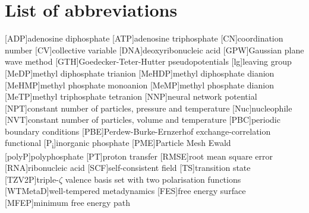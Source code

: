 \chapter*{List of abbreviations}

\begin{acronym}
    [ADP]{adenosine diphosphate}
    [ATP]{adenosine triphosphate}
    [CN]{coordination number}
    [CV]{collective variable}
    [DNA]{deoxyribonucleic acid}
    [GPW]{Gaussian plane wave method}
    [GTH]{Goedecker-Teter-Hutter pseudopotentials}
    [lg]{leaving group}
    [MeDP]{methyl diphosphate trianion}
    [MeHDP]{methyl diphosphate dianion}
    [MeHMP]{methyl phosphate monoanion}
    [MeMP]{methyl phosphate dianion}
    [MeTP]{methyl triphosphate tetranion}
    [NNP]{neural network potential}
    [NPT]{constant number of particles, pressure and temperature}
    [Nuc]{nucleophile}
    [NVT]{constant number of particles, volume and temperature}
    [PBC]{periodic boundary conditions}
    [PBE]{Perdew-Burke-Ernzerhof exchange-correlation functional}
    [P\textsubscript{i}]{inorganic phosphate}
    [PME]{Particle Mesh Ewald}
    [polyP]{polyphosphate}
    [PT]{proton transfer}
    [RMSE]{root mean square error}
    [RNA]{ribonucleic acid}
    [SCF]{self-consistent field}
    [TS]{transition state}
    [TZV2P]{triple-$\zeta$ valence basis set with two polarisation functions}
    [WTMetaD]{well-tempered metadynamics}
    [FES]{free energy surface}
    [MFEP]{minimum free energy path}
\end{acronym}


